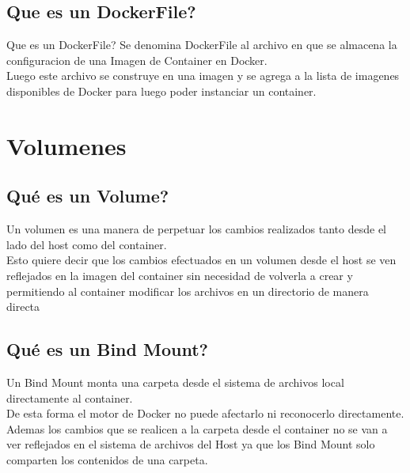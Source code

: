 \documentclass{beamer}
\begin{document}
\subsection{Que es un DockerFile?}
\begin{frame}{Que es un DockerFile?}
	Se denomina DockerFile al archivo en que se almacena la configuracion de una Imagen de Container en Docker. \\
	Luego este archivo se construye en una imagen y se agrega a la lista de imagenes disponibles de Docker para luego poder instanciar un container. \\
\end{frame}

\section{Volumenes}

\subsection{Qué es un Volume?}

\begin{frame}
	Un volumen es una manera de perpetuar los cambios realizados tanto desde el lado del host como del container.\\
	\vspace{.3cm}
	Esto quiere decir que los cambios efectuados en un volumen desde el host se ven reflejados en la imagen del container
	sin necesidad de volverla a crear y permitiendo al container modificar los archivos en un directorio de manera directa\\
\end{frame}

\subsection{Qué es un Bind Mount?}

\begin{frame}
	Un Bind Mount monta una carpeta desde el sistema de archivos local directamente al container. \\
	De esta forma el motor de Docker no puede afectarlo ni reconocerlo directamente. \\
	\vspace{.3cm}
	Ademas los cambios que se realicen a la carpeta desde el container no se van a ver reflejados en el sistema de archivos
	del Host ya que los Bind Mount solo comparten los contenidos de una carpeta. \\
\end{frame}
\end{document}

